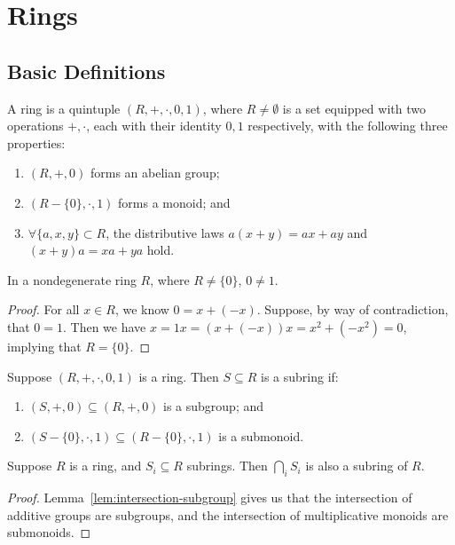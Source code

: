 \chapter{Rings}\label{sec:rings}

\section{Basic Definitions}

\begin{definition}
    A ring is a quintuple \((R,+,\cdot,0,1)\),
    where \(R \neq \emptyset\) is a set
    equipped with two operations \(+,\cdot\),
    each with their identity \(0,1\) respectively,
    with the following three properties:
    \begin{enumerate}[label={(\roman*)}, itemsep=0mm]
        \item \((R,+,0)\) forms an abelian group;
        \item \((R - \{0\},\cdot,1)\) forms a monoid; and
        \item \(\forall \{a,x,y\} \subset R\),
            the distributive laws \(a(x+y) = ax + ay\)
            and \((x+y)a = xa + ya\) hold.
    \end{enumerate}
\end{definition}
\begin{proposition}
    In a nondegenerate ring \(R\), where \(R \neq \{0\}\), \(0 \neq 1\).
\end{proposition}
\begin{proof}
    For all \(x \in R\), we know \(0 = x + (-x)\).
    Suppose, by way of contradiction, that \(0 = 1\).
    Then we have \(x = 1x = (x+(-x))x = x^2 + (-x^2) = 0\),
    implying that \(R = \{0\}\).
\end{proof}

\begin{definition}
    Suppose \((R,+,\cdot,0,1)\) is a ring.
    Then \(S \subseteq R\) is a subring if:
    \begin{enumerate}[label={(\roman*)}, itemsep=0mm]
        \item \((S,+,0) \subseteq (R,+,0)\) is a subgroup; and
        \item \((S - \{0\},\cdot,1) \subseteq (R - \{0\},\cdot,1)\) is a submonoid.
    \end{enumerate}
\end{definition}

\begin{lemma}\label{lem:intersection-subring}
    Suppose \(R\) is a ring, and \(S_i \subseteq R\) subrings.
    Then \(\bigcap_i S_i\) is also a subring of \(R\).
\end{lemma}
\begin{proof}
    Lemma~\ref{lem:intersection-subgroup} gives us that
    the intersection of additive groups are subgroups,
    and the intersection of multiplicative monoids are submonoids.
\end{proof}

